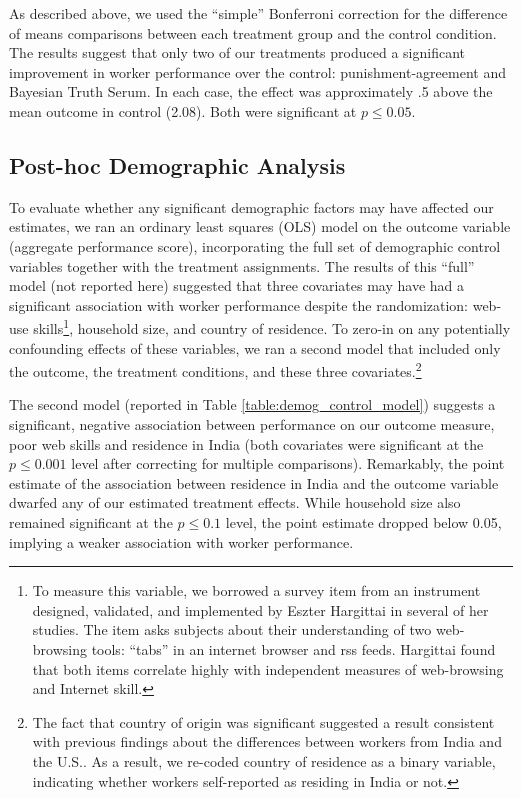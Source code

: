 \documentclass{chi2009}
\begin{document}
{As described above, we used the ``simple'' Bonferroni correction for
the difference of means comparisons between each treatment group and
the control condition. The results suggest that only two of our
treatments produced a significant improvement in worker performance
over the control: punishment-agreement and Bayesian Truth Serum. In
each case, the effect was approximately .5 above the mean outcome in
control (2.08). Both were significant at $p \leq0.05$.


\subsection{Post-hoc Demographic Analysis}
To evaluate whether any significant demographic factors may have
affected our estimates, we ran an ordinary least squares (OLS) model
on the outcome variable (aggregate performance score), incorporating
the full set of demographic control variables together with the
treatment assignments. The results of this ``full'' model (not
reported here) suggested that three covariates may have had a
significant association with worker performance despite the
randomization: web-use skills\footnote{To measure this variable, we
  borrowed a survey item from an instrument designed, validated, and
  implemented by Eszter Hargittai in several of her
  studies.\cite{hargittai2009update} The item asks subjects about
  their understanding of two web-browsing tools: ``tabs'' in an
  internet browser and rss feeds. Hargittai found that both items
  correlate highly with independent measures of web-browsing and
  Internet skill.}, household size, and country of residence. To
zero-in on any potentially confounding effects of these variables, we
ran a second model that included only the outcome, the treatment
conditions, and these three covariates.\footnote{The fact that country
  of origin was significant suggested a result consistent with
  previous findings about the differences between workers from India
  and the U.S.\cite{ipeirotis2010}. As a result, we re-coded country
  of residence as a binary variable, indicating whether workers
  self-reported as residing in India or not.}

The second model (reported in Table \ref{table:demog_control_model}) suggests a significant, negative association between performance on our outcome measure, poor web skills and residence in India (both covariates were significant at the $p \leq 0.001$ level after correcting for multiple comparisons). Remarkably, the point estimate of the association between residence in India and the outcome variable dwarfed any of our estimated treatment effects. While household size also remained significant at the $p \leq 0.1$ level, the point estimate dropped below 0.05, implying a weaker association with worker performance.

}
\end{document}
